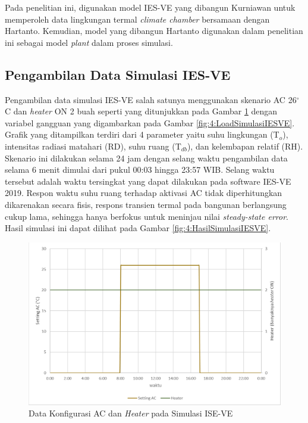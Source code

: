 Pada penelitian ini, digunakan model IES-VE yang dibangun Kurniawan untuk memperoleh data lingkungan termal \textit{climate chamber} bersamaan dengan Hartanto. Kemudian, model yang dibangun Hartanto digunakan dalam penelitian ini sebagai model \textit{plant} dalam proses simulasi.

\subsection{Pengambilan Data Simulasi IES-VE}
Pengambilan data simulasi IES-VE salah satunya menggunakan skenario AC 26$^\circ$C dan \textit{heater} ON 2 buah seperti yang ditunjukkan pada Gambar \ref{fig:4:ACHTSimulasiIESVE} dengan variabel gangguan yang digambarkan pada Gambar \ref{fig:4:LoadSimulasiIESVE}. Grafik yang ditampilkan terdiri dari 4 parameter yaitu suhu lingkungan (T$_o$), intensitas radiasi matahari (RD), suhu ruang (T$_{db}$), dan kelembapan relatif (RH). Skenario ini dilakukan selama 24 jam dengan selang waktu pengambilan data selama 6 menit dimulai dari pukul 00:03 hingga 23:57 WIB. Selang waktu tersebut adalah waktu tersingkat yang dapat dilakukan pada software IES-VE 2019. Respon waktu suhu ruang terhadap aktivasi AC tidak diperhitungkan dikarenakan secara fisis, respons transien termal pada bangunan berlangsung cukup lama, sehingga hanya berfokus untuk meninjau nilai \textit{steady-state error}. Hasil simulasi ini dapat dilihat pada Gambar \ref{fig:4:HasilSimulasiIESVE}.

\begin{figure}[!h]
	\centering
	\includegraphics[width=1\textwidth]{figures/ACHTSimulasiIESVE}
	\caption{Data Konfigurasi AC dan \textit{Heater} pada Simulasi ISE-VE}
	\label{fig:4:ACHTSimulasiIESVE}
\end{figure}
\vspace{1em}

